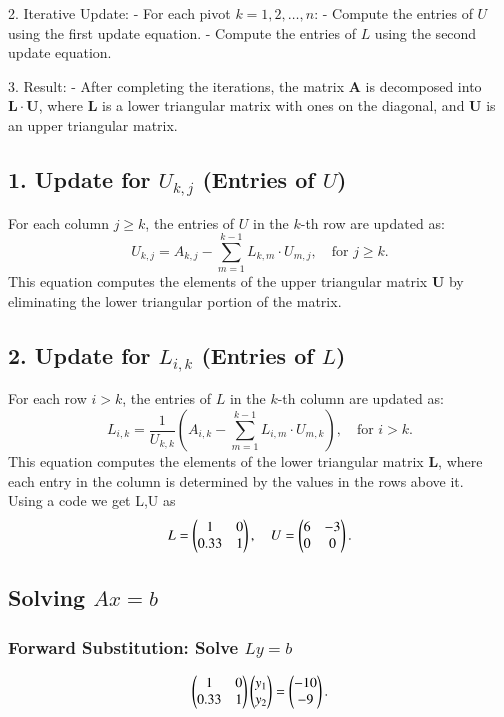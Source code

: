\documentclass[journal]{IEEEtran}
\begin{document}
2. Iterative Update:
   - For each pivot $ k = 1, 2, \ldots, n $:
     - Compute the entries of $ U $ using the first update equation.
     - Compute the entries of $ L $ using the second update equation.
   
3. Result:
   - After completing the iterations, the matrix $ \mathbf{A} $ is decomposed into $ \mathbf{L} \cdot \mathbf{U} $, where $ \mathbf{L} $ is a lower triangular matrix with ones on the diagonal, and $ \mathbf{U} $ is an upper triangular matrix.

    

\subsection*{1. Update for $ U_{k,j} $ (Entries of $ U $)}
For each column $ j \geq k $, the entries of $ U $ in the $ k $-th row are updated as:
\[
U_{k,j} = A_{k,j} - \sum_{m=1}^{k-1} L_{k,m} \cdot U_{m,j}, \quad \text{for } j \geq k.
\]
This equation computes the elements of the upper triangular matrix $ \mathbf{U} $ by eliminating the lower triangular portion of the matrix.

\subsection*{2. Update for $ L_{i,k} $ (Entries of $ L $)}

For each row $ i > k $, the entries of $ L $ in the $ k $-th column are updated as:
\[
L_{i,k} = \frac{1}{U_{k,k}} \left( A_{i,k} - \sum_{m=1}^{k-1} L_{i,m} \cdot U_{m,k} \right), \quad \text{for } i > k.
\]
This equation computes the elements of the lower triangular matrix $ \mathbf{L} $, where each entry in the column is determined by the values in the rows above it.\\
Using a code we get L,U as 
\begin{align}
L = \begin{pmatrix}1 & 0 \\ 0.33 & 1\end{pmatrix}, \quad
U = \begin{pmatrix}6 & -3 \\ 0 & 0\end{pmatrix}.
\end{align}

\subsection*{Solving $A{x} = {b}$}

\subsubsection*{Forward Substitution: Solve $Ly = b$}
\begin{align}
\begin{pmatrix}1 & 0 \\ 0.33 & 1\end{pmatrix}
\begin{pmatrix}y_1 \\ y_2\end{pmatrix}
=
\begin{pmatrix}-10 \\ -9\end{pmatrix}.
\end{align}
\end{document}

